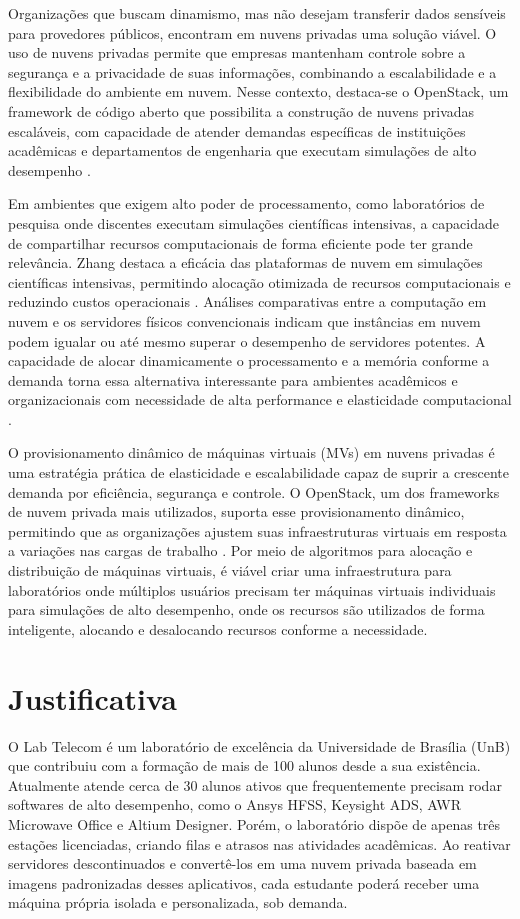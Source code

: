 Organizações que buscam dinamismo, mas não desejam transferir dados sensíveis para provedores públicos, encontram em nuvens privadas uma solução viável. O uso de nuvens privadas permite que empresas mantenham controle sobre a segurança e a privacidade de suas informações, combinando a escalabilidade e a flexibilidade do ambiente em nuvem. Nesse contexto, destaca-se o OpenStack, um framework de código aberto que possibilita a construção de nuvens privadas escaláveis, com capacidade de atender demandas específicas de instituições acadêmicas e departamentos de engenharia que executam simulações de alto desempenho \cite{heuchert2021}. 

Em ambientes que exigem alto poder de processamento, como laboratórios de pesquisa onde discentes executam simulações científicas intensivas, a capacidade de compartilhar recursos computacionais de forma eficiente pode ter grande relevância. Zhang destaca a eficácia das plataformas de nuvem em simulações científicas intensivas, permitindo alocação otimizada de recursos computacionais e reduzindo custos operacionais \cite{xu2021}. Análises comparativas entre a computação em nuvem e os servidores físicos convencionais indicam que instâncias em nuvem podem igualar ou até mesmo superar o desempenho de servidores potentes. A capacidade de alocar dinamicamente o processamento e a memória conforme a demanda torna essa alternativa interessante para ambientes acadêmicos e organizacionais com necessidade de alta performance e elasticidade computacional \cite{roloff2012}. 

O provisionamento dinâmico de máquinas virtuais (MVs) em nuvens privadas é uma estratégia prática de elasticidade e escalabilidade capaz de suprir a crescente demanda por eficiência, segurança e controle. O OpenStack, um dos frameworks de nuvem privada mais utilizados, suporta esse provisionamento dinâmico, permitindo que as organizações ajustem suas infraestruturas virtuais em resposta a variações nas cargas de trabalho \cite{callegati2016}. Por meio de algoritmos para alocação e distribuição de máquinas virtuais, é viável criar uma infraestrutura para laboratórios onde múltiplos usuários precisam ter máquinas virtuais individuais para simulações de alto desempenho, onde os recursos são utilizados de forma inteligente, alocando e desalocando recursos conforme a necessidade.

\section{Justificativa}
O Lab Telecom é um laboratório de excelência da Universidade de Brasília (UnB) que contribuiu com a formação de mais de 100 alunos desde a sua existência. Atualmente atende cerca de 30 alunos ativos que frequentemente precisam rodar softwares de alto desempenho, como o Ansys HFSS, Keysight ADS, AWR Microwave Office e Altium Designer. Porém, o laboratório dispõe de apenas três estações licenciadas, criando filas e atrasos nas atividades acadêmicas. Ao reativar servidores descontinuados e convertê-los em uma nuvem privada baseada em imagens padronizadas desses aplicativos, cada estudante poderá receber uma máquina própria isolada e personalizada, sob demanda.


